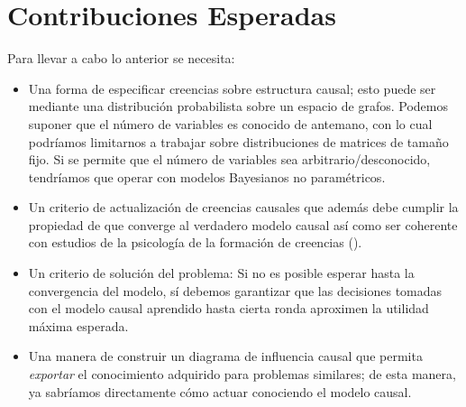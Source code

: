 \documentclass[11pt]{article}
\theoremstyle{plain}
\begin{document}
\section{Contribuciones Esperadas}
Para llevar a cabo lo anterior se necesita:
\begin{itemize}
\item Una forma de especificar creencias sobre estructura causal; esto puede ser mediante una distribución probabilista sobre un espacio de grafos. Podemos suponer que el número de variables es conocido de antemano, con lo cual podríamos limitarnos a trabajar sobre distribuciones de matrices de tamaño fijo. Si se permite que el número de variables sea arbitrario/desconocido, tendríamos que operar con modelos Bayesianos no paramétricos.
\item Un criterio de actualización de creencias causales que además debe cumplir la propiedad de que converge al verdadero modelo causal así como ser coherente con estudios de la psicología de la formación de creencias (\cite{larrouy2017mindreading}).
\item Un criterio de solución del problema: Si no es posible esperar hasta la convergencia del modelo, sí debemos garantizar que las decisiones tomadas con el modelo causal aprendido hasta cierta ronda aproximen la utilidad máxima esperada.
\item Una manera de construir un diagrama de influencia causal que permita \textit{exportar} el conocimiento adquirido para problemas similares; de esta manera, ya sabríamos directamente cómo actuar conociendo el modelo causal.
\end{itemize}
\end{document}
